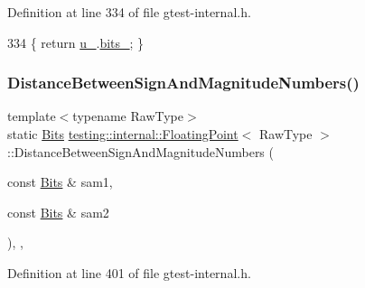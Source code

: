 Definition at line 334 of file gtest-\/internal.\+h.


\begin{DoxyCode}
334 \{ \textcolor{keywordflow}{return} \hyperlink{classtesting_1_1internal_1_1FloatingPoint_a2e0b6bd427248b91476f3fca281f7104}{u\_}.\hyperlink{uniontesting_1_1internal_1_1FloatingPoint_1_1FloatingPointUnion_aedb69e386f5d624a016f7a781302a2bf}{bits\_}; \}
\end{DoxyCode}
\mbox{\label{classtesting_1_1internal_1_1FloatingPoint_afe00f9f26ad2929a061f7e07b8a5071a}} 
\subsubsection{\texorpdfstring{Distance\+Between\+Sign\+And\+Magnitude\+Numbers()}{DistanceBetweenSignAndMagnitudeNumbers()}}
{\footnotesize\ttfamily template$<$typename Raw\+Type$>$ \\
static \hyperlink{classtesting_1_1internal_1_1FloatingPoint_abf228bf6cd48f12c8b44c85b4971a731}{Bits} \hyperlink{classtesting_1_1internal_1_1FloatingPoint}{testing\+::internal\+::\+Floating\+Point}$<$ Raw\+Type $>$\+::Distance\+Between\+Sign\+And\+Magnitude\+Numbers (\begin{DoxyParamCaption}\item[{const \hyperlink{classtesting_1_1internal_1_1FloatingPoint_abf228bf6cd48f12c8b44c85b4971a731}{Bits} \&}]{sam1,  }\item[{const \hyperlink{classtesting_1_1internal_1_1FloatingPoint_abf228bf6cd48f12c8b44c85b4971a731}{Bits} \&}]{sam2 }\end{DoxyParamCaption})\hspace{0.3cm}{\ttfamily [inline]}, {\ttfamily [static]}, {\ttfamily [private]}}



Definition at line 401 of file gtest-\/internal.\+h.


